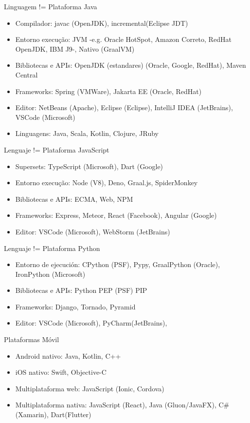 \documentclass[aspectratio=169]{beamer}
\begin{document}
\begin{frame}{Linguagem != Plataforma}
    Java
	\begin{itemize}
	\item Compilador: javac (OpenJDK), incremental(Eclipse JDT)
    \item Entorno execução: JVM -e.g. Oracle HotSpot, Amazon Correto, RedHat OpenJDK, IBM J9-, Nativo (GraalVM)
    \item Bibliotecas e APIs: OpenJDK (estandares) (Oracle, Google, RedHat), Maven Central
    \item Frameworks: Spring (VMWare), Jakarta EE (Oracle, RedHat)
    \item Editor: NetBeans (Apache), Eclipse (Eclipse), IntelliJ IDEA (JetBrains), VSCode (Microsoft)
    \item Linguagens: Java, Scala, Kotlin, Clojure, JRuby
	\end{itemize}
\end{frame}


\begin{frame}{Lenguaje != Plataforma}
    JavaScript
	\begin{itemize}
	\item Supersets: TypeScript (Microsoft), Dart (Google)
    \item Entorno execução: Node (V8), Deno, Graal.js, SpiderMonkey
    \item Bibliotecas e APIs: ECMA, Web, NPM
    \item Frameworks: Express, Meteor, React (Facebook), Angular (Google)
    \item Editor: VSCode (Microsoft), WebStorm (JetBrains)
	\end{itemize}
\end{frame}


\begin{frame}{Lenguaje != Plataforma}
    Python
	\begin{itemize}
    \item Entorno de ejecución: CPython (PSF), Pypy, GraalPython (Oracle), IronPython (Microsoft)
    \item Bibliotecas e APIs: Python PEP (PSF) PIP
    \item Frameworks: Django, Tornado, Pyramid
    \item Editor: VSCode (Microsoft), PyCharm(JetBrains),
	\end{itemize}
\end{frame}

\begin{frame}{Plataformas}
    Móvil
	\begin{itemize}
	\item Android nativo: Java, Kotlin, C++
    \item iOS nativo: Swift, Objective-C
    \item Multiplataforma web: JavaScript (Ionic, Cordova)
    \item Multiplataforma nativa: JavaScript (React), Java (Gluon/JavaFX), C\# (Xamarin), Dart(Flutter)
	\end{itemize}
\end{frame}
\end{document}
